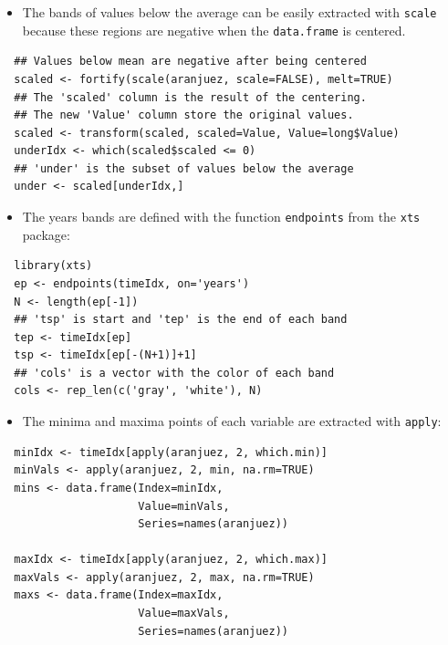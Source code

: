 \documentclass[smallroyalvopaper]{memoir}
\begin{document}
\begin{itemize}
\item The bands of values below the average can be easily extracted with
\texttt{scale} because these regions are negative when the \texttt{data.frame} is
centered.
\end{itemize}
\lstset{language=r,label= ,caption= ,captionpos=b,numbers=none}
\begin{lstlisting}
  ## Values below mean are negative after being centered
  scaled <- fortify(scale(aranjuez, scale=FALSE), melt=TRUE)
  ## The 'scaled' column is the result of the centering.
  ## The new 'Value' column store the original values.
  scaled <- transform(scaled, scaled=Value, Value=long$Value)
  underIdx <- which(scaled$scaled <= 0)
  ## 'under' is the subset of values below the average
  under <- scaled[underIdx,]
\end{lstlisting}

\begin{itemize}
\item The years bands are defined with the function \texttt{endpoints} from the
\texttt{xts} package:
\end{itemize}
\lstset{language=r,label= ,caption= ,captionpos=b,numbers=none}
\begin{lstlisting}
  library(xts)
  ep <- endpoints(timeIdx, on='years')
  N <- length(ep[-1])
  ## 'tsp' is start and 'tep' is the end of each band
  tep <- timeIdx[ep]
  tsp <- timeIdx[ep[-(N+1)]+1]
  ## 'cols' is a vector with the color of each band
  cols <- rep_len(c('gray', 'white'), N)
\end{lstlisting}
\begin{itemize}
\item The minima and maxima points of each variable are extracted with
\texttt{apply}:
\end{itemize}
\lstset{language=r,label= ,caption= ,captionpos=b,numbers=none}
\begin{lstlisting}
  minIdx <- timeIdx[apply(aranjuez, 2, which.min)]
  minVals <- apply(aranjuez, 2, min, na.rm=TRUE)
  mins <- data.frame(Index=minIdx,
                     Value=minVals,
                     Series=names(aranjuez))
  
  maxIdx <- timeIdx[apply(aranjuez, 2, which.max)]
  maxVals <- apply(aranjuez, 2, max, na.rm=TRUE)
  maxs <- data.frame(Index=maxIdx,
                     Value=maxVals,
                     Series=names(aranjuez))
\end{lstlisting}
\end{document}
